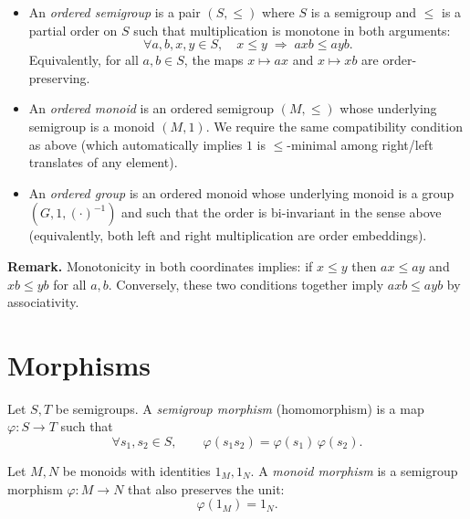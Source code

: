 \begin{definition}
\label{def:ordered-structures}
\leavevmode
\begin{itemize}
  \item An \emph{ordered semigroup} is a pair \((S,\le)\) where \(S\) is a semigroup and \(\le\) is a partial order on \(S\) such that multiplication is monotone in both arguments:
  \[
    \forall a,b,x,y\in S,\quad x\le y \;\Longrightarrow\; a x b \le a y b.
  \]
  Equivalently, for all \(a,b\in S\), the maps \(x\mapsto a x\) and \(x\mapsto x b\) are order-preserving.
  \item An \emph{ordered monoid} is an ordered semigroup \((M,\le)\) whose underlying semigroup is a monoid \((M,1)\). We require the same compatibility condition as above (which automatically implies \(1\) is \(\le\)-minimal among right/left translates of any element).
  \item An \emph{ordered group} is an ordered monoid whose underlying monoid is a group \((G,1,(\cdot)^{-1})\) and such that the order is bi-invariant in the sense above (equivalently, both left and right multiplication are order embeddings).
\end{itemize}
\end{definition}

\noindent\textbf{Remark.}
Monotonicity in both coordinates implies: if \(x\le y\) then \(a x \le a y\) and \(x b \le y b\) for all \(a,b\). Conversely, these two conditions together imply \(a x b \le a y b\) by associativity.


\chapter {Morphisms}

\begin{definition}
\label{def:semigroup-morphism}
Let \(S,T\) be semigroups. A \emph{semigroup morphism} (homomorphism) is a map \(\varphi:S\to T\) such that
\[
\forall s_1,s_2\in S,\qquad \varphi(s_1 s_2)=\varphi(s_1)\,\varphi(s_2).
\]
\end{definition}

\begin{definition}
\label{def:monoid-morphism}
Let \(M,N\) be monoids with identities \(1_M,1_N\). A \emph{monoid morphism} is a semigroup morphism \(\varphi:M\to N\) that also preserves the unit:
\[
\varphi(1_M)=1_N.
\]
\end{definition}

